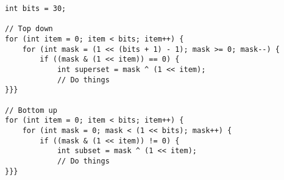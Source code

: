 \begin{verbatim}
int bits = 30;

// Top down
for (int item = 0; item < bits; item++) {
	for (int mask = (1 << (bits + 1) - 1); mask >= 0; mask--) {
		if ((mask & (1 << item)) == 0) {
			int superset = mask ^ (1 << item);
			// Do things
}}}

// Bottom up
for (int item = 0; item < bits; item++) {
	for (int mask = 0; mask < (1 << bits); mask++) {
		if ((mask & (1 << item)) != 0) {
			int subset = mask ^ (1 << item);
			// Do things
}}}
\end{verbatim}